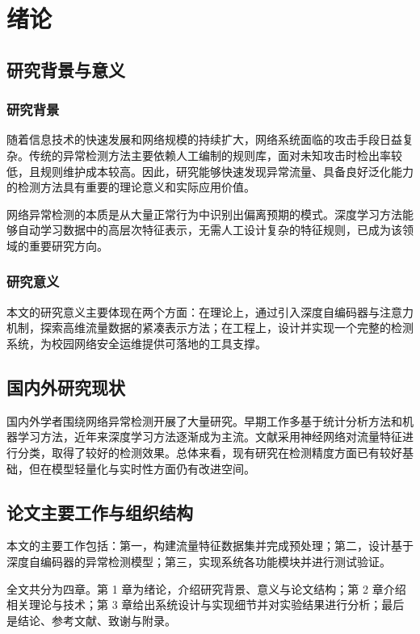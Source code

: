 \chapter{绪论}

\section{研究背景与意义}

\subsection{研究背景}

随着信息技术的快速发展和网络规模的持续扩大，网络系统面临的攻击手段日益复杂。传统的异常检测方法主要依赖人工编制的规则库，面对未知攻击时检出率较低，且规则维护成本较高。因此，研究能够快速发现异常流量、具备良好泛化能力的检测方法具有重要的理论意义和实际应用价值。

网络异常检测的本质是从大量正常行为中识别出偏离预期的模式\cite{liu1997}。深度学习方法能够自动学习数据中的高层次特征表示，无需人工设计复杂的特征规则，已成为该领域的重要研究方向。

\subsection{研究意义}

本文的研究意义主要体现在两个方面：在理论上，通过引入深度自编码器与注意力机制，探索高维流量数据的紧凑表示方法；在工程上，设计并实现一个完整的检测系统，为校园网络安全运维提供可落地的工具支撑。

\section{国内外研究现状}

国内外学者围绕网络异常检测开展了大量研究。早期工作多基于统计分析方法和机器学习方法，近年来深度学习方法逐渐成为主流。文献\cite{yuan2001}采用神经网络对流量特征进行分类，取得了较好的检测效果。总体来看，现有研究在检测精度方面已有较好基础，但在模型轻量化与实时性方面仍有改进空间。

\section{论文主要工作与组织结构}

本文的主要工作包括：第一，构建流量特征数据集并完成预处理；第二，设计基于深度自编码器的异常检测模型；第三，实现系统各功能模块并进行测试验证。

全文共分为四章。第 1 章为绪论，介绍研究背景、意义与论文结构；第 2 章介绍相关理论与技术；第 3 章给出系统设计与实现细节并对实验结果进行分析；最后是结论、参考文献、致谢与附录。
